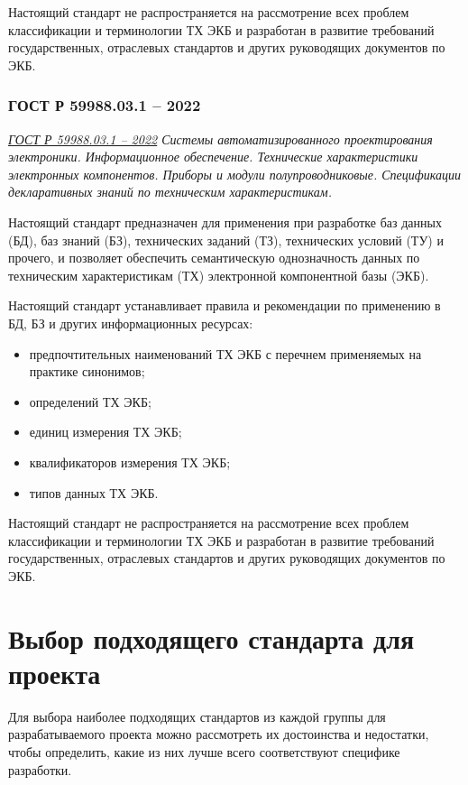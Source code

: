 Настоящий стандарт не распространяется на рассмотрение
всех проблем классификации и терминологии ТХ ЭКБ
и разработан в развитие требований государственных,
отраслевых стандартов и других руководящих документов по ЭКБ.

\subsubsection{ГОСТ Р 59988.03.1 -- 2022}

\emph{\href{https://docs.cntd.ru/document/1200195155}{ГОСТ Р 59988.03.1 -- 2022}
Системы автоматизированного проектирования электроники.
Информационное обеспечение.
Технические характеристики электронных компонентов.
Приборы и модули полупроводниковые.
Спецификации декларативных знаний по техническим характеристикам.
}

Настоящий стандарт предназначен для применения при разработке
баз данных (БД), баз знаний (БЗ), технических заданий (ТЗ),
технических условий (ТУ) и прочего,
и позволяет обеспечить семантическую однозначность данных
по техническим характеристикам (ТХ) электронной компонентной базы (ЭКБ).

Настоящий стандарт устанавливает правила и рекомендации
по применению в БД, БЗ и других информационных ресурсах:

\begin{itemize}
	\item предпочтительных наименований ТХ ЭКБ
		с перечнем применяемых на практике синонимов;
	\item определений ТХ ЭКБ;
	\item единиц измерения ТХ ЭКБ;
	\item квалификаторов измерения ТХ ЭКБ;
	\item типов данных ТХ ЭКБ.
\end{itemize}

Настоящий стандарт не распространяется на рассмотрение
всех проблем классификации и терминологии ТХ ЭКБ
и разработан в развитие требований государственных, отраслевых стандартов
и других руководящих документов по ЭКБ.

\clearpage

\section{Выбор подходящего стандарта для проекта}

Для выбора наиболее подходящих стандартов из каждой группы
для разрабатываемого проекта можно рассмотреть их достоинства и недостатки,
чтобы определить, какие из них лучше всего соответствуют специфике разработки.

